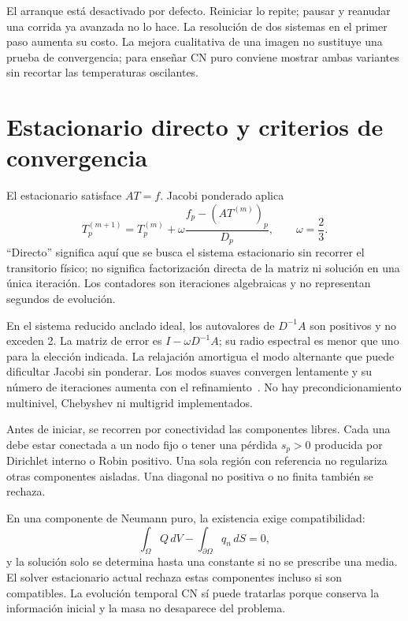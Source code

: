 \documentclass[11pt,a4paper]{article}
\begin{document}
El arranque está desactivado por defecto. Reiniciar lo repite; pausar y
reanudar una corrida ya avanzada no lo hace. La resolución de dos sistemas
en el primer paso aumenta su costo. La mejora cualitativa de una imagen no
sustituye una prueba de convergencia; para enseñar CN puro conviene mostrar
ambas variantes sin recortar las temperaturas oscilantes.

\FloatBarrier
\section{Estacionario directo y criterios de convergencia}
\label{sec:steady}
El estacionario satisface $AT=f$. Jacobi ponderado aplica
\begin{equation}
 T_p^{(m+1)}=T_p^{(m)}+\omega\frac{f_p-(AT^{(m)})_p}{D_p},
 \qquad \omega=\frac23.
 \label{eq:stationary}
\end{equation}
``Directo'' significa aquí que se busca el sistema estacionario sin recorrer
el transitorio físico; no significa factorización directa de la matriz ni
solución en una única iteración. Los contadores son iteraciones algebraicas
y no representan segundos de evolución.

En el sistema reducido anclado ideal, los autovalores de $D^{-1}A$ son
positivos y no exceden 2. La matriz de error es
$I-\omega D^{-1}A$; su radio espectral es menor que uno para la elección
indicada. La relajación amortigua el modo alternante que puede dificultar
Jacobi sin ponderar. Los modos suaves convergen lentamente y su número de
iteraciones aumenta con el refinamiento~\cite{templates}. No hay
precondicionamiento multinivel, Chebyshev ni multigrid implementados.

Antes de iniciar, se recorren por conectividad las componentes libres.
Cada una debe estar conectada a un nodo fijo o tener una pérdida $s_p>0$
producida por Dirichlet interno o Robin positivo. Una sola región con
referencia no regulariza otras componentes aisladas. Una diagonal no positiva
o no finita también se rechaza.

En una componente de Neumann puro, la existencia exige compatibilidad:
\begin{equation}
 \int_\Omega Q\,dV-\int_{\partial\Omega}q_n\,dS=0,
 \label{eq:compat}
\end{equation}
y la solución solo se determina hasta una constante si no se prescribe una
media. El solver estacionario actual rechaza estas componentes incluso si
son compatibles. La evolución temporal CN sí puede tratarlas porque conserva
la información inicial y la masa no desaparece del problema.
\end{document}
